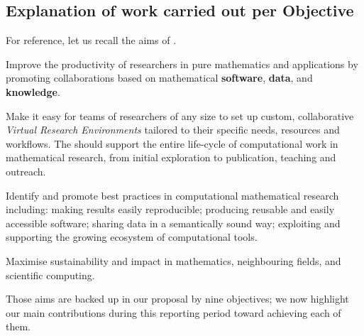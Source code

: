 \subsection{Explanation of work carried out per Objective}
For reference, let us recall the aims of \ODK.
\begin{compactenum}[\bf {Aim} 1\rm]
\item \label{aim:collaboration} Improve the productivity of
  researchers in pure mathematics and applications by promoting
  collaborations based on mathematical \textbf{software},
  \textbf{data}, and \textbf{knowledge}.
\item \label{aim:vre} Make it easy for teams of researchers of any
  size to set up custom, collaborative \emph{Virtual Research
    Environments} tailored to their specific needs, resources and
  workflows. The \VREs should support the entire life-cycle of
  computational work in mathematical research, from initial
  exploration to publication, teaching and outreach.
\item \label{aim:sharing} Identify and promote best practices in
  computational mathematical research including: making results easily
  reproducible; producing reusable and easily accessible
  software; sharing data in a semantically sound way; exploiting and
  supporting the growing ecosystem of computational tools.
\item \label{aim:impact} Maximise sustainability and impact in
  mathematics, neighbouring fields, and scientific computing.
\end{compactenum}

Those aims are backed up in our proposal by nine objectives; we now
highlight our main contributions during this reporting period toward
achieving each of them.

